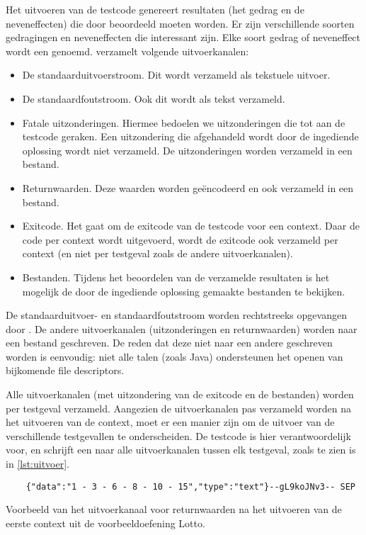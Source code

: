 Het uitvoeren van de testcode genereert resultaten (het gedrag en de neveneffecten) die door \tested{} beoordeeld moeten worden.
Er zijn verschillende soorten gedragingen en neveneffecten die interessant zijn.
Elke soort gedrag of neveneffect wordt een  genoemd.
\tested{} verzamelt volgende uitvoerkanalen:
\begin{itemize}
    \item De standaarduitvoerstroom.
    Dit wordt verzameld als tekstuele uitvoer.
    \item De standaardfoutstroom.
    Ook dit wordt als tekst verzameld.
    \item Fatale uitzonderingen.
    Hiermee bedoelen we uitzonderingen die tot aan de testcode geraken.
    Een uitzondering die afgehandeld wordt door de ingediende oplossing wordt niet verzameld.
    De uitzonderingen worden verzameld in een bestand.
    \item Returnwaarden.
    Deze waarden worden geëncodeerd en ook verzameld in een bestand.
    \item Exitcode.
    Het gaat om de exitcode van de testcode voor een context.
    Daar de code per context wordt uitgevoerd, wordt de exitcode ook verzameld per context (en niet per testgeval zoals de andere uitvoerkanalen).
    \item Bestanden.
    Tijdens het beoordelen van de verzamelde resultaten is het mogelijk de door de ingediende oplossing gemaakte bestanden te bekijken.
\end{itemize}

De standaarduitvoer- en standaardfoutstroom worden rechtstreeks opgevangen door \tested{}.
De andere uitvoerkanalen (uitzonderingen en returnwaarden) worden naar een bestand geschreven.
De reden dat deze niet naar een andere  geschreven worden is eenvoudig: niet alle talen (zoals Java) ondersteunen het openen van bijkomende file descriptors.

Alle uitvoerkanalen (met uitzondering van de exitcode en de bestanden) worden per testgeval verzameld.
Aangezien de uitvoerkanalen pas verzameld worden na het uitvoeren van de context, moet er een manier zijn om de uitvoer van de verschillende testgevallen te onderscheiden.
De testcode is hier verantwoordelijk voor, en schrijft een  naar alle uitvoerkanalen tussen elk testgeval, zoals te zien is in \cref{lst:uitvoer}.

\begin{listing}
    \begin{verbatim}
    {"data":"1 - 3 - 6 - 8 - 10 - 15","type":"text"}--gL9koJNv3-- SEP
    \end{verbatim}
    \caption{Voorbeeld van het uitvoerkanaal voor returnwaarden na het uitvoeren van de eerste context uit de voorbeeldoefening Lotto.}
    \label{lst:uitvoer}
\end{listing}

